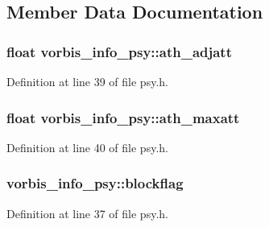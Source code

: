 \subsection{Member Data Documentation}
\subsubsection[{\texorpdfstring{ath\+\_\+adjatt}{ath_adjatt}}]{\setlength{\rightskip}{0pt plus 5cm}float vorbis\+\_\+info\+\_\+psy\+::ath\+\_\+adjatt}\hypertarget{structvorbis__info__psy_a299a4a5373e48f994fee99cc701299e7}{}\label{structvorbis__info__psy_a299a4a5373e48f994fee99cc701299e7}


Definition at line 39 of file psy.\+h.

\subsubsection[{\texorpdfstring{ath\+\_\+maxatt}{ath_maxatt}}]{\setlength{\rightskip}{0pt plus 5cm}float vorbis\+\_\+info\+\_\+psy\+::ath\+\_\+maxatt}\hypertarget{structvorbis__info__psy_a59d8b44072c5de4de4a7a79b30cf0595}{}\label{structvorbis__info__psy_a59d8b44072c5de4de4a7a79b30cf0595}


Definition at line 40 of file psy.\+h.

\subsubsection[{\texorpdfstring{blockflag}{blockflag}}]{ vorbis\+\_\+info\+\_\+psy\+::blockflag}\hypertarget{structvorbis__info__psy_a884dea13b7446c8f28f40d5ae3faa144}{}\label{structvorbis__info__psy_a884dea13b7446c8f28f40d5ae3faa144}


Definition at line 37 of file psy.\+h.

